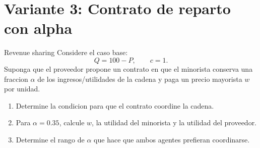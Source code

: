 \section{Variante 3: Contrato de reparto con alpha}

\begin{enunciado}{Revenue sharing}
Considere el caso base:
\[
Q=100-P,
\qquad
c=1.
\]
Suponga que el proveedor propone un contrato en que el minorista conserva una fraccion \(\alpha\) de los ingresos/utilidades de la cadena y paga un precio mayorista \(w\) por unidad.

\begin{enumerate}[label=(\alph*)]
    \item Determine la condicion para que el contrato coordine la cadena.
    \item Para \(\alpha=0.35\), calcule \(w\), la utilidad del minorista y la utilidad del proveedor.
    \item Determine el rango de \(\alpha\) que hace que ambos agentes prefieran coordinarse.
\end{enumerate}
\end{enunciado}
